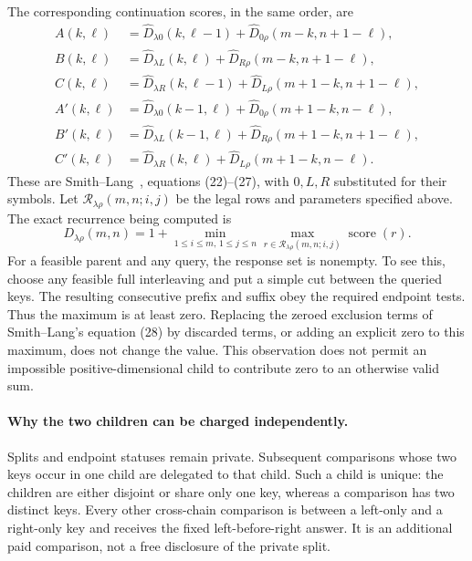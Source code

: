 \documentclass[11pt]{article}
\theoremstyle{definition}
\theoremstyle{remark}
\begin{document}
The corresponding continuation scores, in the same order, are
\begin{align*}
 A(k,\ell)&=\widehat D_{\lambda0}(k,\ell-1)
             +\widehat D_{0\rho}(m-k,n+1-\ell),\\
 B(k,\ell)&=\widehat D_{\lambda L}(k,\ell)
             +\widehat D_{R\rho}(m-k,n+1-\ell),\\
 C(k,\ell)&=\widehat D_{\lambda R}(k,\ell-1)
             +\widehat D_{L\rho}(m+1-k,n+1-\ell),\\
 A'(k,\ell)&=\widehat D_{\lambda0}(k-1,\ell)
              +\widehat D_{0\rho}(m+1-k,n-\ell),\\
 B'(k,\ell)&=\widehat D_{\lambda L}(k-1,\ell)
              +\widehat D_{R\rho}(m+1-k,n+1-\ell),\\
 C'(k,\ell)&=\widehat D_{\lambda R}(k,\ell)
              +\widehat D_{L\rho}(m+1-k,n-\ell).
\end{align*}
These are Smith--Lang~\cite{smithlang}, equations (22)--(27), with
$0,L,R$ substituted for their symbols.  Let
$\mathcal R_{\lambda\rho}(m,n;i,j)$ be the legal rows and parameters
specified above.  The exact recurrence being computed is
\begin{equation}
 D_{\lambda\rho}(m,n)
 =1+\min_{1\le i\le m,\,1\le j\le n}
       \max_{r\in\mathcal R_{\lambda\rho}(m,n;i,j)}
              \operatorname{score}(r).
 \label{eq:nine-state-recurrence}
\end{equation}
For a feasible parent and any query, the response set is nonempty.
To see this, choose any feasible full interleaving and put a simple cut
between the queried keys.  The resulting consecutive prefix and suffix
obey the required endpoint tests.  Thus the maximum is at least zero.
Replacing the zeroed exclusion terms of Smith--Lang's equation (28) by
discarded terms, or adding an explicit zero to this maximum, does not
change the value.  This observation does not permit an impossible
positive-dimensional child to contribute zero to an otherwise valid sum.

\paragraph{Why the two children can be charged independently.}
Splits and endpoint statuses remain private.  Subsequent comparisons
whose two keys occur in one child are delegated to that child.  Such a
child is unique: the children are either disjoint or share only one key,
whereas a comparison has two distinct keys.  Every other cross-chain
comparison is between a left-only and a right-only key and receives the
fixed left-before-right answer.  It is an additional paid comparison,
not a free disclosure of the private split.
\end{document}
